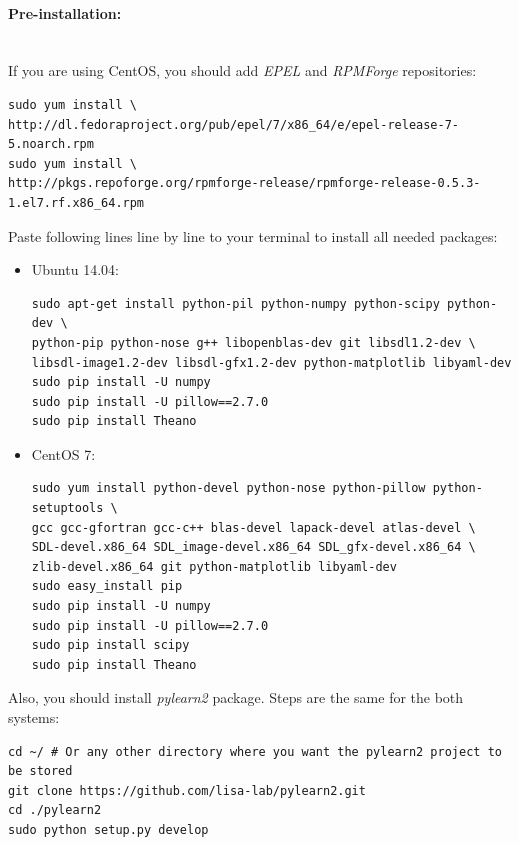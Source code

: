 \documentclass[a4paper,oneside,dvipsnames]{article}
\begin{document}
\paragraph*{Pre-installation:}\mbox{}\\
If you are using CentOS, you should add \textit{EPEL} and \textit{RPMForge} repositories:
\begin{verbatim}
sudo yum install \
http://dl.fedoraproject.org/pub/epel/7/x86_64/e/epel-release-7-5.noarch.rpm
sudo yum install \
http://pkgs.repoforge.org/rpmforge-release/rpmforge-release-0.5.3-1.el7.rf.x86_64.rpm
\end{verbatim}

\noindent
Paste following lines line by line to your terminal to install all needed packages:
\begin{itemize}
\item Ubuntu 14.04:
\begin{verbatim}
sudo apt-get install python-pil python-numpy python-scipy python-dev \
python-pip python-nose g++ libopenblas-dev git libsdl1.2-dev \
libsdl-image1.2-dev libsdl-gfx1.2-dev python-matplotlib libyaml-dev
sudo pip install -U numpy
sudo pip install -U pillow==2.7.0
sudo pip install Theano
\end{verbatim}
\item CentOS 7:
\begin{verbatim}
sudo yum install python-devel python-nose python-pillow python-setuptools \
gcc gcc-gfortran gcc-c++ blas-devel lapack-devel atlas-devel \
SDL-devel.x86_64 SDL_image-devel.x86_64 SDL_gfx-devel.x86_64 \
zlib-devel.x86_64 git python-matplotlib libyaml-dev
sudo easy_install pip
sudo pip install -U numpy
sudo pip install -U pillow==2.7.0
sudo pip install scipy
sudo pip install Theano
\end{verbatim}
\end{itemize}

Also, you should install \textit{pylearn2} package. Steps are the same for the both systems:
\begin{verbatim}
cd ~/ # Or any other directory where you want the pylearn2 project to be stored
git clone https://github.com/lisa-lab/pylearn2.git
cd ./pylearn2
sudo python setup.py develop
\end{verbatim}
\end{document}
